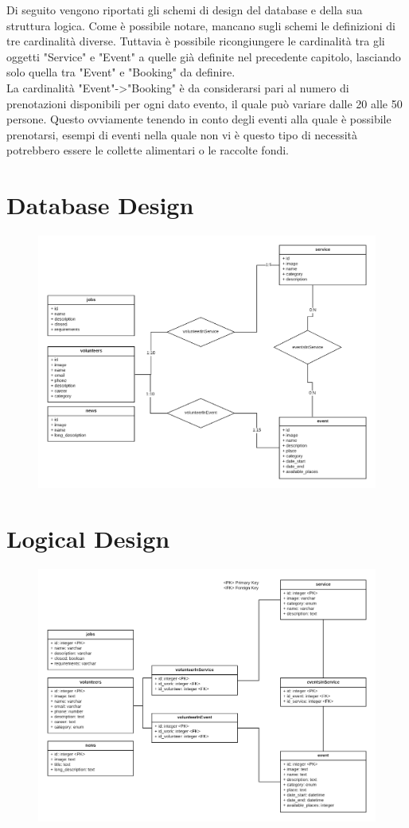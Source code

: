 Di seguito vengono riportati gli schemi di design del database e della sua
struttura logica. Come è possibile notare, mancano sugli schemi le definizioni
di tre cardinalità diverse. Tuttavia è possibile ricongiungere le cardinalità
tra gli oggetti "Service" e "Event" a quelle già definite nel precedente
capitolo, lasciando solo quella tra "Event" e "Booking" da definire.\\
La cardinalità "Event"->"Booking" è da considerarsi pari al numero di
prenotazioni disponibili per ogni dato evento, il quale può variare dalle 20
alle 50 persone. Questo ovviamente tenendo in conto degli eventi alla quale è
possibile prenotarsi, esempi di eventi nella quale non vi è questo tipo di
necessità potrebbero essere le collette alimentari o le raccolte fondi.
    \section{Database Design}
    \begin{figure}[H] 
        \centering 
        \includegraphics[scale=0.3]{resources/images/db.png}
    \end{figure}
    \section{Logical Design}
    \begin{figure}[H] 
        \centering
        \includegraphics[scale=0.3]{resources/images/logical.png}
    \end{figure}